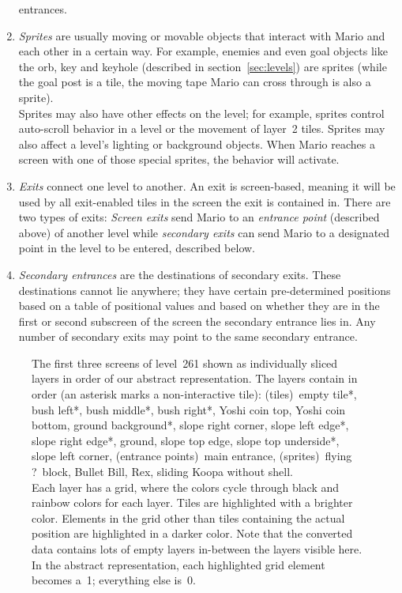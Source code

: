 \begin{enumerate}
  entrances.
\item \emph{Sprites} are usually moving or movable objects that
  interact with Mario and each other in a certain way. For example,
  enemies and even goal objects like the orb, key and keyhole
  (described in section~\ref{sec:levels}) are sprites (while the goal
  post is a tile, the moving tape Mario can cross through is also a
  sprite). \\
  Sprites may also have other effects on the level; for example,
  sprites control auto-scroll behavior in a level or the movement of
  layer~2 tiles. Sprites may also affect a level's lighting or
  background objects. When Mario reaches a screen with one of those
  special sprites, the behavior will activate.
\item \emph{Exits} connect one level to another. An exit is
  screen-based, meaning it will be used by all exit-enabled tiles in
  the screen the exit is contained in. There are two types of exits:
  \emph{Screen exits} send Mario to an \emph{entrance point}
  (described above) of another level while \emph{secondary exits} can
  send Mario to a designated point in the level to be entered,
  described below.
\item \emph{Secondary entrances} are the destinations of secondary
  exits. These destinations cannot lie anywhere; they have certain
  pre-determined positions based on a table of positional values and
  based on whether they are in the first or second subscreen of the
  screen the secondary entrance lies in. Any number of secondary exits
  may point to the same secondary entrance.
\end{enumerate}

\begin{figure}[p]
  \centering
  \caption{The first three screens of level~261 shown as individually
    sliced layers in order of our abstract representation. The layers
    contain in order (an asterisk marks a non-interactive tile):
    (tiles)~empty tile*, bush left*, bush middle*, bush right*, Yoshi
    coin top, Yoshi coin bottom, ground background*, slope right
    corner, slope left edge*, slope right edge*, ground, slope top
    edge, slope top underside*, slope left corner, (entrance
    points)~main entrance, (sprites)~flying ?~block, Bullet Bill, Rex,
    sliding Koopa without shell. \\
    \medskip
    Each layer has a grid, where the colors cycle through black and
    rainbow colors for each layer. Tiles are highlighted with a
    brighter color. Elements in the grid other than tiles containing
    the actual position are highlighted in a darker color. Note that
    the converted data contains lots of empty layers in-between the
    layers visible here. \\
    \medskip
    In the abstract representation, each highlighted grid element
    becomes a~1; everything else is~0.}
  \label{fig:sliced}
\end{figure}

